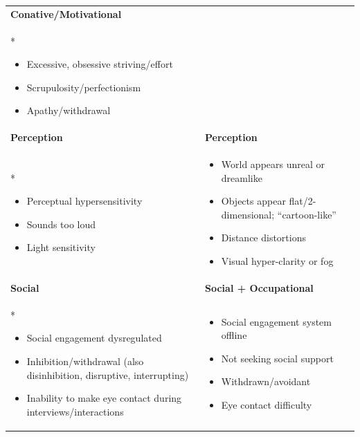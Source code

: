 \documentclass[11pt,oneside]{book}
\newenvironment{compactitemize}
{\begin{itemize}[nosep, leftmargin=1em, itemsep=0pt, topsep=0pt]}
{\end{itemize}}
\begin{document}
\begin{longtable}{p{}|p{}}
\addlinespace[1em]
\textbf{Conative/Motivational} & \\*
\begin{compactitemize}
\item Excessive, obsessive striving/effort
\item Scrupulosity/perfectionism
\item Apathy/withdrawal
\end{compactitemize}
& \\

\addlinespace[1em]
\textbf{Perception} & \textbf{Perception} \\*
\begin{compactitemize}
\item Perceptual hypersensitivity
\item Sounds too loud
\item Light sensitivity
\end{compactitemize}
&
\begin{compactitemize}
\item World appears unreal or dreamlike
\item Objects appear flat/2-dimensional; \enquote{cartoon-like}
\item Distance distortions
\item Visual hyper-clarity or fog
\end{compactitemize} \\

\addlinespace[1em]
\textbf{Social} & \textbf{Social + Occupational} \\*
\begin{compactitemize}
\item Social engagement dysregulated
\item Inhibition/withdrawal (also disinhibition, disruptive, interrupting)
\item Inability to make eye contact during interviews/interactions
\end{compactitemize}
&
\begin{compactitemize}
\item Social engagement system offline
\item Not seeking social support
\item Withdrawn/avoidant
\item Eye contact difficulty
\end{compactitemize} \\


\end{longtable}
\end{document}
